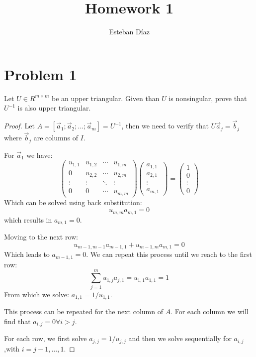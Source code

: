 \documentclass[10pt]{article}
\author{Esteban D\'{i}az}
\title{Homework 1}{}
\begin{document}
\maketitle

\section{Problem 1}
Let $U\in R^{m\times m}$ be an upper triangular. Given than $U$ 
is nonsingular, prove that $U^{-1}$ is also upper triangular. 

\begin{proof}
Let $A=[\vec{a}_1 ; \vec{a}_2; ...; \vec{a}_m]=U^{-1}$, then we need 
to verify that $U \vec{a}_j =\vec{b}_j$ where $\vec{b}_j$ are columns of
$I$. 

For $\vec{a}_1$ we have:
\[
 \begin{pmatrix}
  u_{1,1} & u_{1,2} & \cdots & u_{1,m} \\
    0     & u_{2,2} & \cdots & u_{2,m} \\
  \vdots  & \vdots  & \ddots & \vdots  \\
   0      &    0    & \cdots & u_{m,m}
 \end{pmatrix}
 \begin{pmatrix}
  a_{1,1}  \\
  a_{2,1}  \\ 
  \vdots \\
  a_{m,1}
 \end{pmatrix}
 = 
  \begin{pmatrix}
  1 \\ 
  0 \\ 
  \vdots \\ 
  0 
  \end{pmatrix}
\]
  Which can be solved using back substitution:
 \[
   u_{m,m} a_{m,1} = 0 
 \]
  which results in $a_{m,1}= 0$.
  
  Moving to the next row: 
 \[
   u_{m-1,m-1} a_{m-1,1} + u_{m-1,m} a_{m,1} =0
 \]
  Which leads to $a_{m-1,1} = 0$.
  We can repeat this process until we reach to the first row:
  \[
     \sum_{j=1}^{m} u_{1,j} a_{j,1} = u_{1,1}a_{1,1} =1
  \]
  From which we solve: $a_{1,1} = 1/u_{1,1}$.

  This process can be repeated for the next column of $A$. 
  For each column we will find that $a_{i,j} = 0\forall i>j$.
  
  For each row, we first solve $a_{j,j} = 1/u_{j,j}$ and then we solve 
  sequentially for $a_{i,j}$ ,with $i=j-1,\dots,1$.
\end{proof}
\end{document}
